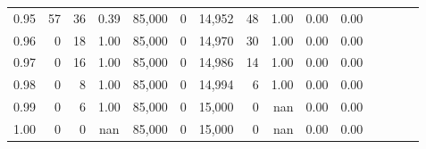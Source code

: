 \begin{tabular}{rrrcrrrrrrrrrrr}
0.95 &     57 &   36 &                                       0.39 &  85,000 &       0 &  14,952 &      48 &  1.00 &  0.00 &                         0.00 \\
0.96 &      0 &   18 &                                       1.00 &  85,000 &       0 &  14,970 &      30 &  1.00 &  0.00 &                         0.00 \\
0.97 &      0 &   16 &                                       1.00 &  85,000 &       0 &  14,986 &      14 &  1.00 &  0.00 &                         0.00 \\
0.98 &      0 &    8 &                                       1.00 &  85,000 &       0 &  14,994 &       6 &  1.00 &  0.00 &                         0.00 \\
0.99 &      0 &    6 &                                       1.00 &  85,000 &       0 &  15,000 &       0 &   nan &  0.00 &                         0.00 \\
1.00 &      0 &    0 &                                        nan &  85,000 &       0 &  15,000 &       0 &   nan &  0.00 &                         0.00 \\
\bottomrule
\end{tabular}
